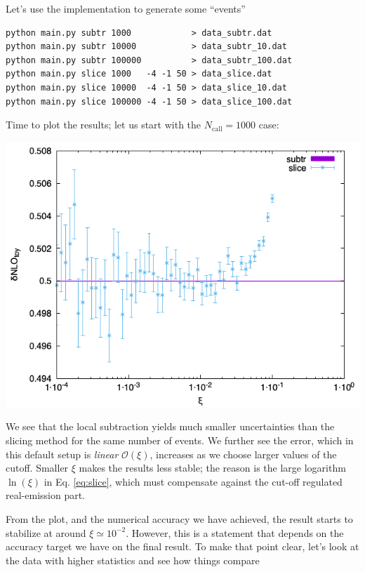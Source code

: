 \documentclass[11pt]{article}
\begin{document}
Let's use the implementation to generate some ``events''
\begin{verbatim}
python main.py subtr 1000            > data_subtr.dat
python main.py subtr 10000           > data_subtr_10.dat
python main.py subtr 100000          > data_subtr_100.dat
python main.py slice 1000   -4 -1 50 > data_slice.dat
python main.py slice 10000  -4 -1 50 > data_slice_10.dat
python main.py slice 100000 -4 -1 50 > data_slice_100.dat
\end{verbatim}
Time to plot the results; let us start with the \(N_\mathrm{call}=1000\) case:
\begin{center}
\includegraphics[width=.9\linewidth]{data.png}
\end{center}
We see that the local subtraction yields much smaller uncertainties than the slicing method for the same number of events.
We further see the error, which in this default setup is \emph{linear} \(\mathcal{O}(\xi)\), increases as we choose larger values of the cutoff.
Smaller \(\xi\) makes the results less stable; the reason is the large logarithm \(\ln(\xi)\) in Eq. \eqref{eq:slice}, which must compensate against the cut-off regulated real-emission part.

From the plot, and the numerical accuracy we have achieved, the result starts to stabilize at around \(\xi \simeq 10^{-2}\).
However, this is a statement that depends on the accuracy target we have on the final result.
To make that point clear, let's look at the data with higher statistics and see how things compare
\end{document}

